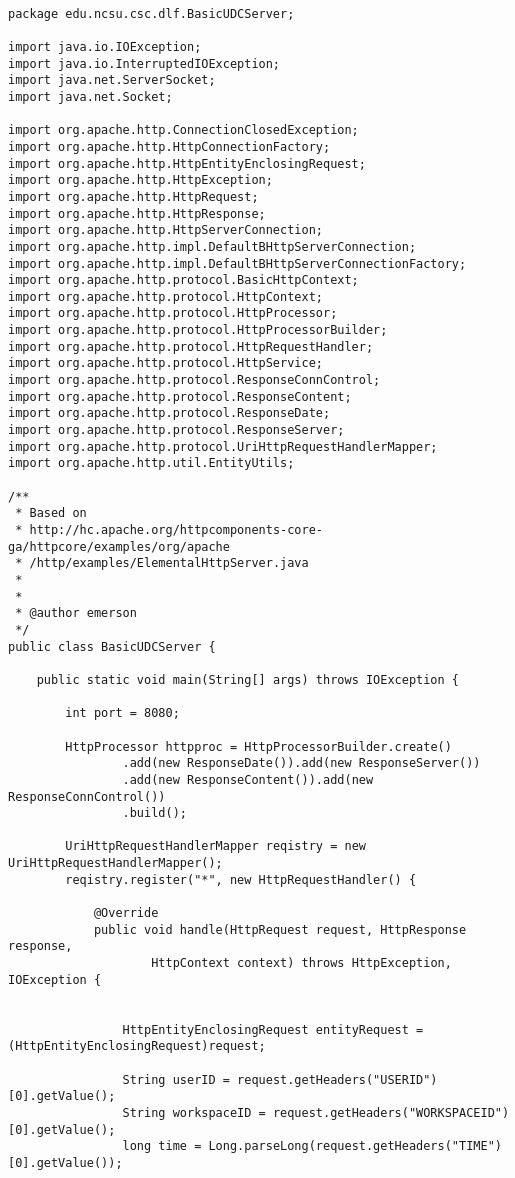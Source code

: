 \begin{lstlisting}

package edu.ncsu.csc.dlf.BasicUDCServer;

import java.io.IOException;
import java.io.InterruptedIOException;
import java.net.ServerSocket;
import java.net.Socket;

import org.apache.http.ConnectionClosedException;
import org.apache.http.HttpConnectionFactory;
import org.apache.http.HttpEntityEnclosingRequest;
import org.apache.http.HttpException;
import org.apache.http.HttpRequest;
import org.apache.http.HttpResponse;
import org.apache.http.HttpServerConnection;
import org.apache.http.impl.DefaultBHttpServerConnection;
import org.apache.http.impl.DefaultBHttpServerConnectionFactory;
import org.apache.http.protocol.BasicHttpContext;
import org.apache.http.protocol.HttpContext;
import org.apache.http.protocol.HttpProcessor;
import org.apache.http.protocol.HttpProcessorBuilder;
import org.apache.http.protocol.HttpRequestHandler;
import org.apache.http.protocol.HttpService;
import org.apache.http.protocol.ResponseConnControl;
import org.apache.http.protocol.ResponseContent;
import org.apache.http.protocol.ResponseDate;
import org.apache.http.protocol.ResponseServer;
import org.apache.http.protocol.UriHttpRequestHandlerMapper;
import org.apache.http.util.EntityUtils;

/**
 * Based on
 * http://hc.apache.org/httpcomponents-core-ga/httpcore/examples/org/apache
 * /http/examples/ElementalHttpServer.java
 * 
 * 
 * @author emerson
 */
public class BasicUDCServer {

	public static void main(String[] args) throws IOException {

		int port = 8080;

		HttpProcessor httpproc = HttpProcessorBuilder.create()
				.add(new ResponseDate()).add(new ResponseServer())
				.add(new ResponseContent()).add(new ResponseConnControl())
				.build();

		UriHttpRequestHandlerMapper reqistry = new UriHttpRequestHandlerMapper();
		reqistry.register("*", new HttpRequestHandler() {

			@Override
			public void handle(HttpRequest request, HttpResponse response,
					HttpContext context) throws HttpException, IOException {


				HttpEntityEnclosingRequest entityRequest = (HttpEntityEnclosingRequest)request;
				
				String userID = request.getHeaders("USERID")[0].getValue();
				String workspaceID = request.getHeaders("WORKSPACEID")[0].getValue();
				long time = Long.parseLong(request.getHeaders("TIME")[0].getValue());


\end{lstlisting}
